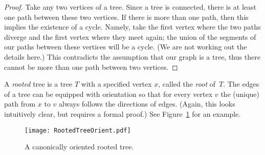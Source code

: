 \begin{proof}
Take any two vertices of a tree.
Since a tree is connected, there is at least one path between these two vertices.
If there is more than one path, then this implies the existence of a cycle.
Namely, take the first vertex where the two paths diverge and the first vertex where they meet again;
the union of the segments of our paths between these vertices will be a cycle.
(We are not working out the details here.)
This contradicts the assumption that our graph is a tree, thus there cannot be more than one path between two vertices.
\end{proof}

A \emph{rooted} tree is a tree $T$ with a specified vertex $x$, called the \emph{root} of~$T$.
The edges of a tree can be equipped with orientation so that for every vertex $v$ the (unique) path from $x$ to $v$ always follows the directions of edges.
(Again, this looks intuitively clear, but requires a formal proof.)
See Figure~\ref{fig:RootedTreeOrient} for an example.

\begin{figure}[ht]
\begin{center}
\texttt{[image: RootedTreeOrient.pdf]}
\end{center}
\caption{A canonically oriented rooted tree.}
\label{fig:RootedTreeOrient}
\end{figure}

